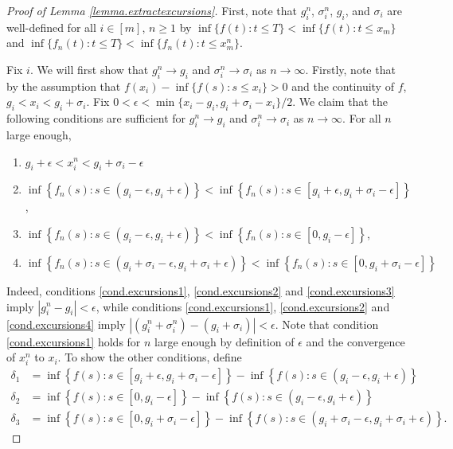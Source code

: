 \begin{proof}[Proof of Lemma \ref{lemma.extractexcursions}]
First, note that $g_i^n$, $\sigma_i^n$, $g_i$, and $\sigma_i$ are well-defined for all $i\in [m]$, $n\geq 1$ by $\inf\{f(t):t\leq T\}<\inf\{f(t):t\leq x_m\}$ and $\inf\{f_n(t):t\leq T\}<\inf\{f_n(t):t\leq x^n_m\}$.

Fix $i$. We will first show that $g^n_i\to g_i$ and $\sigma_i^n\to \sigma_i$ as $n\to \infty$. Firstly, note that by the assumption that $f(x_i)-\inf\{f(s):s\leq x_i\}>0$ and the continuity of $f$, $g_i<x_i<g_i+\sigma_i$. Fix $0<\epsilon<\min\{x_i-g_i,g_i+\sigma_i-x_i\}/2$. We claim that the following conditions are sufficient for $g^n_i\to g_i$ and $\sigma_i^n\to \sigma_i$ as $n\to \infty$. For all $n$ large enough,
\begin{enumerate}
    \item \label{cond.excursions1} $g_i+\epsilon<x^n_i<g_i+\sigma_i-\epsilon$
    \item \label{cond.excursions2}$\inf\left\{f_n(s):s\in (g_i-\epsilon, g_i+\epsilon)\right\}<\inf\left\{f_n(s):s\in [g_i+\epsilon,g_i+\sigma_i-\epsilon] \right\}$, 
    \item \label{cond.excursions3}$\inf\left\{f_n(s):s\in (g_i-\epsilon, g_i+\epsilon)\right\}<\inf\left\{f_n(s):s\in [0,g_i-\epsilon]\right\}$,
    \item \label{cond.excursions4} $\inf\left\{ f_n(s):s\in (g_i+\sigma_i-\epsilon,g_i+\sigma_i+\epsilon)\right\}<\inf\left\{f_n(s):s\in [0,g_i+\sigma_i-\epsilon]\right\}$
\end{enumerate}
Indeed, conditions \ref{cond.excursions1}, \ref{cond.excursions2} and \ref{cond.excursions3} imply $|g^n_i-g_i|<\epsilon$, while conditions \ref{cond.excursions1}, \ref{cond.excursions2} and \ref{cond.excursions4} imply $|(g^n_i+\sigma^n_i)-(g_i+\sigma_i)|<\epsilon$. Note that condition \ref{cond.excursions1} holds for $n$ large enough by definition of $\epsilon$ and the convergence of $x_i^n$ to $x_i$. To show the other conditions, define
\begin{align*}\delta_1&=\inf\left\{f(s):s\in [g_i+\epsilon,g_i+\sigma_i-\epsilon]\right\}-\inf\left\{f(s):s\in (g_i-\epsilon,g_i+\epsilon)\right\}\\
\delta_2&=\inf\left\{f(s):s\in [0,g_i-\epsilon]\right\}-\inf\left\{f(s):s\in (g_i-\epsilon,g_i+\epsilon)\right\}\\
\delta_3&=\inf\left\{f(s):s\in [0,g_i+\sigma_i-\epsilon]\right\}-\inf\left\{f(s):s\in (g_i+\sigma_i-\epsilon,g_i+\sigma_i+\epsilon)\right\}.
\end{align*}

\end{proof}
